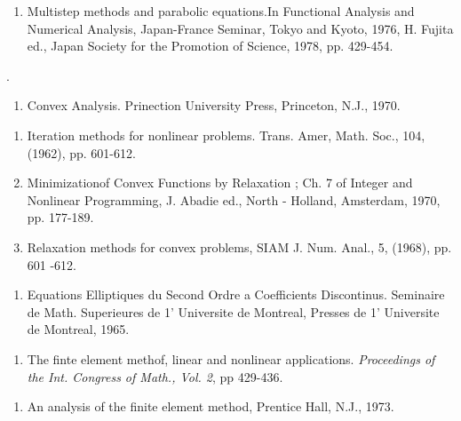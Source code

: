 \begin{thebibliography}{99}
\begin{enumerate}
  \item Multistep methods and parabolic equations.In Functional
 Analysis and Numerical Analysis, Japan-France Seminar, Tokyo and
 Kyoto, 1976, H. Fujita ed., Japan Society for the Promotion of
 Science, 1978, pp. 429-454.\label{k80:e2}  
  \end{enumerate}
 
 .
 
  \begin{enumerate}
  \item Convex Analysis. Prinection University Press, Princeton, N.J.,
 1970.\label{k81:e1} 
  \end{enumerate}
 
 
  \begin{enumerate}
  \item  Iteration methods for nonlinear problems. Trans. Amer,
 Math. Soc., 104, (1962), pp. 601-612.\label{k82:e1} 

  \item Minimization\pageoriginale of Convex Functions by Relaxation ; Ch. 7 of
 Integer and Nonlinear Programming, J. Abadie ed., North - Holland,
 Amsterdam, 1970, pp. 177-189.\label{k82:e2} 

  \item Relaxation methods for convex problems, SIAM J. Num. Anal., 5,
 (1968), pp. 601 -612.\label{k82:e3} 
  \end{enumerate}


  \begin{enumerate}
  \item Equations Elliptiques du Second Ordre a Coefficients
 Discontinus. Seminaire de Math. Superieures de 1' Universite de
 Montreal, Presses de 1' Universite de Montreal, 1965.\label{k83:e1} 
  \end{enumerate}


  \begin{enumerate}
  \item  The finte element methof, linear and nonlinear
    applications. {\em Proceedings of the Int. Congress of Math.,
      Vol. 2}, pp 429-436.\label{k84:e1}
  \end{enumerate}


  \begin{enumerate}
  \item An  analysis of the finite element method, Prentice Hall,
    N.J., 1973.\label{k85:e1}
  \end{enumerate}


\end{thebibliography}
